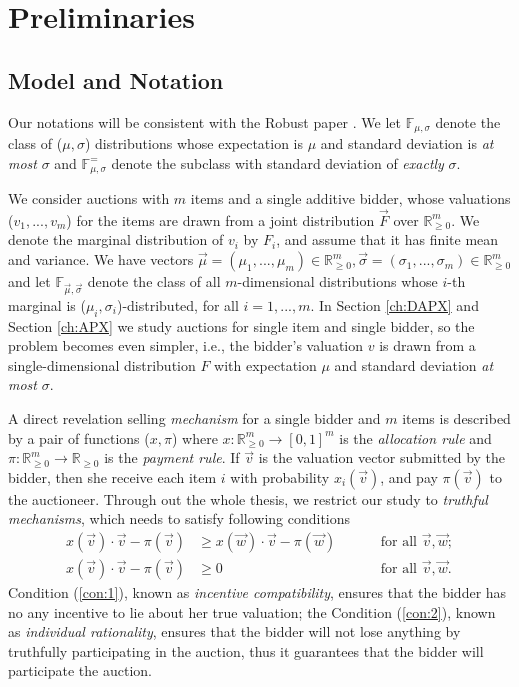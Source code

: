 \chapter{Preliminaries}
\label{ch:Preliminaries}
\section{Model and Notation}
Our notations will be consistent with the Robust paper \cite{giannakopoulos2020robust}. We let $\mathbb{F}_{\mu,\sigma}$ denote the class of ($\mu, \sigma$) distributions whose expectation is $\mu$ and standard deviation is \textit{at most} $\sigma$ and  $\mathbb{F}^=_{\mu,\sigma}$ denote the subclass with standard deviation of \textit{exactly} $\sigma$.

We consider auctions with $m$ items and a single additive bidder, whose valuations ($v_1,...,v_m$) for the items are drawn from a joint distribution $\vec{F}$ over $\mathbb{R}^m_{\geqslant0}$. We denote the marginal distribution of $v_i$ by $F_i$, and assume that it has finite mean and variance. We have vectors $\vec{\mu} = (\mu_1,...,\mu_m) \in \mathbb{R}^m_{\geqslant0}, \vec{\sigma} = (\sigma_1,...,\sigma_m) \in \mathbb{R}^m_{\geqslant0}$ and let $\mathbb{F}_{\vec{\mu},\vec{\sigma}}$ denote the class of all $m$-dimensional distributions whose $i$-th marginal is ($\mu_i, \sigma_i$)-distributed, for all $i = 1,...,m$. In Section \ref{ch:DAPX} and Section \ref{ch:APX} we study auctions for single item and single bidder, so the problem becomes even simpler, i.e., the bidder's valuation $v$ is drawn from a single-dimensional distribution $F$ with expectation $\mu$ and standard deviation \textit{at most} $\sigma$.

A direct revelation selling \textit{mechanism} for a single bidder and $m$ items is described by a pair of functions ($x,\pi$) where $x: \mathbb{R}^m_{\geqslant0} \to [0,1]^m $ is the \textit{allocation rule} and $\pi:\mathbb{R}^m_{\geqslant0} \to\mathbb{R}_{\geqslant0}$ is the \textit{payment rule}. If $\vec{v}$ is the valuation vector submitted by the bidder, then she receive each item $i$ with probability $x_i(\vec{v})$, and pay $\pi(\vec{v})$ to the auctioneer. Through out the whole thesis, we restrict our study to \textit{truthful mechanisms}, which needs to satisfy following conditions
\begin{align}
    \label{con:1}
    x(\vec{v}) \cdot \vec{v} - \pi(\vec{v}) &\geqslant x(\vec{w}) \cdot \vec{v} - \pi(\vec{w}) \hspace{1cm} &\text{for all }  \vec{v}, \vec{w};\\
    \label{con:2}
    x(\vec{v}) \cdot \vec{v} - \pi(\vec{v}) &\geqslant 0 \hspace{2cm} &\text{for all }  \vec{v}, \vec{w}.
\end{align}
Condition (\ref{con:1}), known as \textit{incentive compatibility}, ensures that the bidder has no any incentive to lie about her true valuation; the Condition (\ref{con:2}), known as \textit{individual rationality}, ensures that the bidder will not lose anything by truthfully participating in the auction, thus it guarantees that the bidder will participate the auction.

